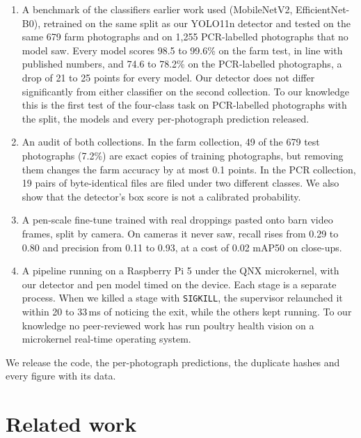 \documentclass[10pt,twocolumn]{article}
\begin{document}
\begin{enumerate}
\item A benchmark of the classifiers earlier work used (MobileNetV2, EfficientNet-B0), retrained on the same split as
  our YOLO11n detector and tested on the same 679 farm photographs and on 1,255 PCR-labelled photographs that no model
  saw. Every model scores 98.5 to 99.6\% on the farm test, in line with published numbers, and 74.6 to 78.2\% on the
  PCR-labelled photographs, a drop of 21 to 25 points for every model. Our detector does not differ significantly from
  either classifier on the second collection. To our knowledge this is the first test of the four-class task on
  PCR-labelled photographs with the split, the models and every per-photograph prediction released.
\item An audit of both collections. In the farm collection, 49 of the 679 test photographs (7.2\%) are exact copies of
  training photographs, but removing them changes the farm accuracy by at most 0.1 points. In the PCR collection, 19
  pairs of byte-identical files are filed under two different classes. We also show that the detector's box score is
  not a calibrated probability.
\item A pen-scale fine-tune trained with real droppings pasted onto barn video frames, split by camera. On cameras it
  never saw, recall rises from 0.29 to 0.80 and precision from 0.11 to 0.93, at a cost of 0.02 mAP50 on close-ups.
\item A pipeline running on a Raspberry Pi 5 under the QNX microkernel, with our detector and pen model timed on the
  device. Each stage is a separate process. When we killed a stage with \texttt{SIGKILL}, the supervisor relaunched it within 20 to 33\,ms of noticing the exit, while the others kept running. To our knowledge no peer-reviewed work has run poultry health vision on a
  microkernel real-time operating system.
\end{enumerate}

We release the code, the per-photograph predictions, the duplicate hashes and every figure with its data.

\section{Related work}
\label{sec:related}
\end{document}
